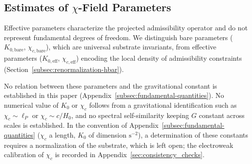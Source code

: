 \subsection{Estimates of \texorpdfstring{$\chi$}{χ}-Field Parameters}
  \label{subsec:chi-parameters}

  Effective parameters characterize the projected admissibility operator and
  do not represent fundamental degrees of freedom.
  We distinguish bare parameters ($K_{0,\mathrm{bare}}$,
  $\chi_{c,\mathrm{bare}}$), which are universal substrate invariants,
  from effective parameters ($K_{0,\mathrm{eff}}$,
  $\chi_{c,\mathrm{eff}}$) encoding the local density of admissibility constraints
  (Section~\ref{subsec:renormalization-hbar}).

  No relation between these parameters and the gravitational constant is established in this paper
  (Appendix~\ref{subsec:fundamental-quantities}).
  No numerical value of $K_0$ or $\chi_c$ follows from a gravitational identification such as $\chi_c \sim \ell_P$
  or $\chi_c \sim c/H_0$, and no spectral self-similarity keeping $G$ constant across scales is established.
  In the convention of Appendix~\ref{subsec:fundamental-quantities} ($\chi_c$ a length, $K_0$ of dimension
  $\mathrm{s}^{-2}$), a determination of these constants requires a normalization of the substrate, which is left
  open; the electroweak calibration of $\chi_c$ is recorded in Appendix~\ref{sec:consistency_checks}.
